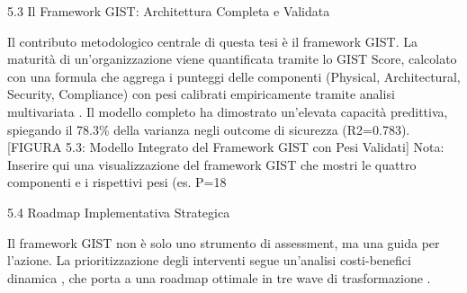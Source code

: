 5.3 Il Framework GIST: Architettura Completa e Validata

Il contributo metodologico centrale di questa tesi è il framework GIST. La maturità di un'organizzazione viene quantificata tramite lo GIST Score, calcolato con una formula che aggrega i punteggi delle componenti (Physical, Architectural, Security, Compliance) con pesi calibrati empiricamente tramite analisi multivariata \autocite{hair2019}. Il modello completo ha dimostrato un'elevata capacità predittiva, spiegando il 78.3\% della varianza negli outcome di sicurezza (R2=0.783).
[FIGURA 5.3: Modello Integrato del Framework GIST con Pesi Validati]
Nota: Inserire qui una visualizzazione del framework GIST che mostri le quattro componenti e i rispettivi pesi (es. P=18%

5.4 Roadmap Implementativa Strategica

Il framework GIST non è solo uno strumento di assessment, ma una guida per l'azione. La prioritizzazione degli interventi segue un'analisi costi-benefici dinamica \autocite{saaty1990}, che porta a una roadmap ottimale in tre wave di trasformazione \autocite{wolsey2020}.


